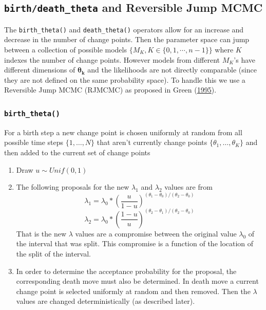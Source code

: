 \documentclass[11pt,a4paper]{article}
\numberwithin{equation}{section}
\begin{document}
\hypertarget{birthdeath_theta-and-reversible-jump-mcmc}{%
\subsection{\texorpdfstring{\texttt{birth/death\_theta} and Reversible
Jump
MCMC}{birth/death\_theta and Reversible Jump MCMC}}\label{birthdeath_theta-and-reversible-jump-mcmc}}

The \texttt{birth\_theta()} and \texttt{death\_theta()} operators allow
for an increase and decrease in the number of change points. Then the
parameter space can jump between a collection of possible models
\(\{M_K, K \in \{0,1,\cdots,n-1\}\}\) where \(K\) indexes the number of
change points. However models from different \(M_K\)'s have different
dimensions of \(\boldsymbol{\theta_k}\) and the likelihoods are not
directly comparable (since they are not defined on the same probability
space). To handle this we use a Reversible Jump MCMC (RJMCMC) as
proposed in Green (\protect\hyperlink{ref-green_reversible_1995}{1995}).

\hypertarget{birth_theta}{%
\subsubsection{\texorpdfstring{\texttt{birth\_theta()}}{birth\_theta()}}\label{birth_theta}}

For a birth step a new change point is chosen uniformly at random from
all possible time steps \(\{1,\dots,N\}\) that aren't currently change
points \(\{\theta_1,\dots,\theta_K\}\) and then added to the current set
of change points

\begin{enumerate}
\def\labelenumi{\arabic{enumi}.}
\item
  Draw \(u \sim Unif(0,1)\)
\item
  The following proposals for the new \(\lambda_1\) and \(\lambda_2\)
  values are from
  \[\lambda_1 = \lambda_0*(\frac{u}{1-u})^{(\theta_1-\theta_0)/(\theta_2-\theta_0)}\]
  \[\lambda_2 = \lambda_0*(\frac{1-u}{u})^{(\theta_2-\theta_1)/(\theta_2-\theta_0)}\]
  That is the new \(\lambda\) values are a compromise between the
  original value \(\lambda_0\) of the interval that was split. This
  compromise is a function of the location of the split of the interval.
\item
  In order to determine the acceptance probability for the proposal, the
  corresponding death move must also be determined. In death move a
  current change point is selected uniformly at random and then removed.
  Then the \(\lambda\) values are changed deterministically (as
  described later).
\end{enumerate}
\end{document}
